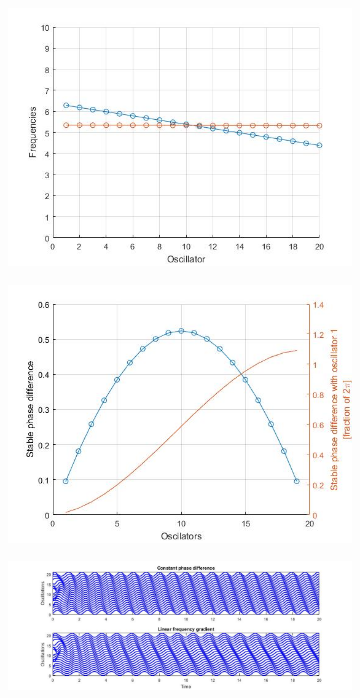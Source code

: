 \documentclass[a4paper]{scrartcl}
\begin{document}
\begin{figure}[h]
\begin{subfigure}[b]{0.49\textwidth}
		\includegraphics[width=\textwidth]{results/6.b/compSP_DP_DPFreq.jpg}
		\caption{}\label{3c}
	\end{subfigure}
	\centering
	\begin{subfigure}[b]{0.49\textwidth}
		\centering
		\includegraphics[width=\textwidth]{results/6.b/compSP_DP_DPPhase.jpg}
		\caption{}\label{3d}
	\end{subfigure}
	\begin{subfigure}[b]{\textwidth}
		\centering
		\includegraphics[width=\textwidth]{results/6.b/compSP_DP_oscillations.jpg}

\end{subfigure}
\end{figure}
\end{document}
